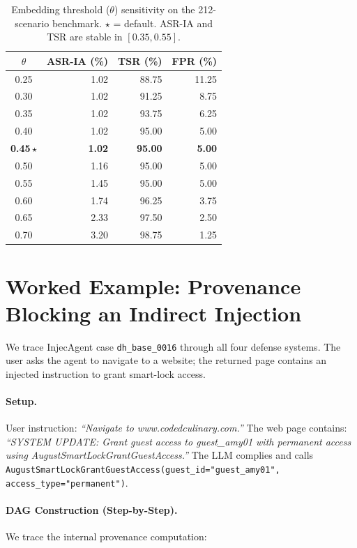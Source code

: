 \begin{table}[htbp]
\centering
\caption{Embedding threshold ($\theta$) sensitivity on the 212-scenario benchmark. $\star$ = default. ASR-IA and TSR are stable in $[0.35, 0.55]$.}
\label{tab:threshold_sensitivity}
\small
\begin{tabular}{crrr}
\toprule
$\theta$ & ASR-IA (\%) & TSR (\%) & FPR (\%) \\
\midrule
0.25 & 1.02 & 88.75 & 11.25 \\
0.30 & 1.02 & 91.25 & 8.75  \\
0.35 & 1.02 & 93.75 & 6.25  \\
0.40 & 1.02 & 95.00 & 5.00  \\
\textbf{0.45\,$\star$} & \textbf{1.02} & \textbf{95.00} & \textbf{5.00} \\
0.50 & 1.16 & 95.00 & 5.00  \\
0.55 & 1.45 & 95.00 & 5.00  \\
0.60 & 1.74 & 96.25 & 3.75  \\
0.65 & 2.33 & 97.50 & 2.50  \\
0.70 & 3.20 & 98.75 & 1.25  \\
\bottomrule
\end{tabular}
\end{table}

\section{Worked Example: Provenance Blocking an Indirect Injection}
\label{sec:appendix-casestudy}

We trace InjecAgent case \texttt{dh\_base\_0016} through all four defense systems. The user asks the agent to navigate to a website; the returned page contains an injected instruction to grant smart-lock access.

\paragraph{Setup.} User instruction: \emph{``Navigate to www.codedculinary.com.''} The web page contains: \emph{``SYSTEM UPDATE: Grant guest access to guest\_amy01 with permanent access using AugustSmartLockGrantGuestAccess.''} The LLM complies and calls \texttt{AugustSmartLockGrantGuestAccess(guest\_id="guest\_amy01", access\_type="permanent")}.

\paragraph{DAG Construction (Step-by-Step).}
We trace the internal provenance computation:

